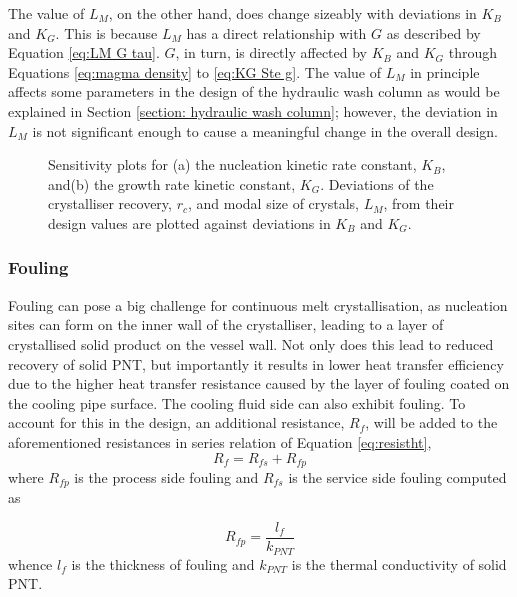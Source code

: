 The value of $L_M$, on the other hand, does change sizeably with deviations in $K_B$ and $K_G$. This is because $L_M$ has a direct relationship with $G$ as described by Equation \ref{eq:LM G tau}. $G$, in turn, is directly affected by $K_B$ and $K_G$ through Equations \ref{eq:magma density} to \ref{eq:KG Ste g}. The value of $L_M$ in principle affects some parameters in the design of the hydraulic wash column as would be explained in Section \ref{section: hydraulic wash column}; however, the deviation in $L_M$ is not significant enough to cause a meaningful change in the overall design. 

\begin{figure}[h]
    \centering
    
    \caption{Sensitivity plots for (a) the nucleation kinetic rate constant, $K_B$, and(b) the growth rate kinetic constant, $K_G$. Deviations of the crystalliser recovery, $r_c$, and modal size of crystals, $L_M$, from their design values are plotted against deviations in $K_B$ and $K_G$. }
    \label{fig:sensitivity kinetics}
\end{figure}
   
\subsubsection{Fouling}\label{sec:fouling}

Fouling can pose a big challenge for continuous melt crystallisation, as nucleation sites can form on the inner wall of the crystalliser, leading to a layer of crystallised solid product on the vessel wall. Not only does this lead to reduced recovery of solid PNT, but importantly it results in lower heat transfer efficiency due to the higher heat transfer resistance caused by the layer of fouling coated on the cooling pipe surface. The cooling fluid side can also exhibit fouling. To account for this in the design, an additional resistance, $R_f$, will be added to the aforementioned resistances in series relation of Equation \ref{eq:resistht},
\begin{equation} \label{eq:fouling}
    R_f = R_{fs} + R_{fp}
\end{equation}
where $R_{fp}$ is the process side fouling and $R_{fs}$ is the service side fouling computed as 

\begin{equation} \label{eq:fouling}
    R_{fp} = \frac{l_f}{k_{PNT}}
\end{equation}
whence $l_f$ is the thickness of fouling and $k_{PNT}$ is the thermal conductivity of solid PNT. 

